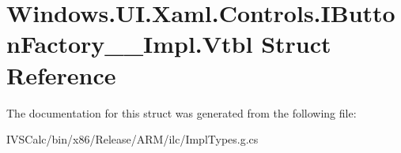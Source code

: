 \hypertarget{struct_windows_1_1_u_i_1_1_xaml_1_1_controls_1_1_i_button_factory_____impl_1_1_vtbl}{}\section{Windows.\+U\+I.\+Xaml.\+Controls.\+I\+Button\+Factory\+\_\+\+\_\+\+Impl.\+Vtbl Struct Reference}
\label{struct_windows_1_1_u_i_1_1_xaml_1_1_controls_1_1_i_button_factory_____impl_1_1_vtbl}


The documentation for this struct was generated from the following file\+:\begin{DoxyCompactItemize}
\item 
I\+V\+S\+Calc/bin/x86/\+Release/\+A\+R\+M/ilc/Impl\+Types.\+g.\+cs\end{DoxyCompactItemize}
